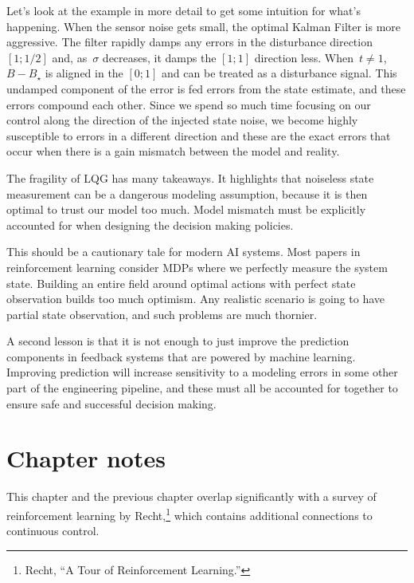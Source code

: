 \documentclass{tufte-book}
\begin{document}
Let's look at the example in more detail to get some intuition for
what's happening. When the sensor noise gets small, the optimal Kalman
Filter is more aggressive. The filter rapidly damps any errors in the
disturbance direction~\([1;1/2]\) and, as~\(\sigma\) decreases, it damps
the \([1;1]\) direction less. When~\(t \neq 1\),~\(B-B_\star\) is
aligned in the \([0;1]\) and can be treated as a disturbance signal.
This undamped component of the error is fed errors from the state
estimate, and these errors compound each other. Since we spend so much
time focusing on our control along the direction of the injected state
noise, we become highly susceptible to errors in a different direction
and these are the exact errors that occur when there is a gain mismatch
between the model and reality.

The fragility of LQG has many takeaways. It highlights that noiseless
state measurement can be a dangerous modeling assumption, because it is
then optimal to trust our model too much. Model mismatch must be
explicitly accounted for when designing the decision making policies.

This should be a cautionary tale for modern AI systems. Most papers in
reinforcement learning consider MDPs where we perfectly measure the
system state. Building an entire field around optimal actions with
perfect state observation builds too much optimism. Any realistic
scenario is going to have partial state observation, and such problems
are much thornier.

A second lesson is that it is not enough to just improve the prediction
components in feedback systems that are powered by machine learning.
Improving prediction will increase sensitivity to a modeling errors in
some other part of the engineering pipeline, and these must all be
accounted for together to ensure safe and successful decision making.

\hypertarget{chapter-notes-11}{%
\section{Chapter notes}\label{chapter-notes-11}}

This chapter and the previous chapter overlap significantly with a
survey of reinforcement learning by Recht,\footnote{Recht, {``A Tour of
  Reinforcement Learning.''}} which contains additional connections to
continuous control.
\end{document}
